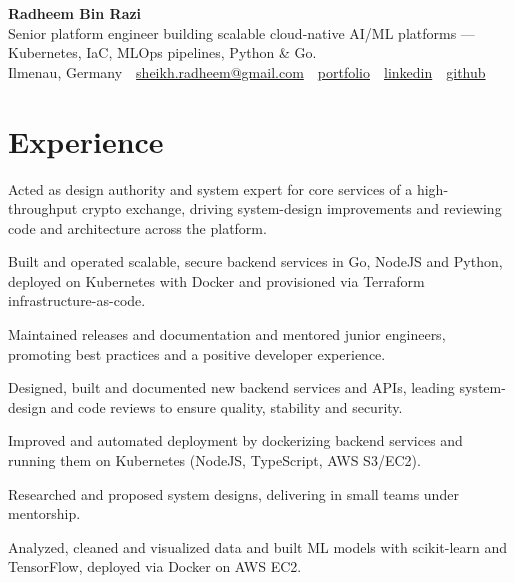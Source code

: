 \documentclass[11pt,a4paper]{resume}
\makeatletter
\newcommand{\Portfolio}{https://radheem.github.io/my-cv}
\newcommand{\PortfolioText}{portfolio}
\newcommand{\GitHub}{https://github.com/radheem}
\newcommand{\LinkedIn}{https://www.linkedin.com/in/radheem-razi}
\newcommand{\Email}{sheikh.radheem@gmail.com}
\makeatother
\begin{document}
\begin{center}
  {\huge\bfseries Radheem Bin Razi}\\[3pt]
  {\large Senior platform engineer building scalable cloud-native AI/ML platforms — Kubernetes, IaC, MLOps pipelines, Python \& Go.}\\[6pt]
  \small
  Ilmenau, Germany \,\textbar\,
  \href{mailto:\Email}{\Email} \,\textbar\,
  \href{\Portfolio}{\PortfolioText} \,\textbar\,
  \href{\LinkedIn}{linkedin} \,\textbar\,
  \href{\GitHub}{github}
\end{center}
\vspace{2pt}

\section{Experience}

\bullets
  \item Acted as design authority and system expert for core services of a high-throughput crypto exchange, driving system-design improvements and reviewing code and architecture across the platform.
  \item Built and operated scalable, secure backend services in Go, NodeJS and Python, deployed on Kubernetes with Docker and provisioned via Terraform infrastructure-as-code.
  \item Maintained releases and documentation and mentored junior engineers, promoting best practices and a positive developer experience.
\bulletsend
\vspace{3pt}
\bullets
  \item Designed, built and documented new backend services and APIs, leading system-design and code reviews to ensure quality, stability and security.
  \item Improved and automated deployment by dockerizing backend services and running them on Kubernetes (NodeJS, TypeScript, AWS S3/EC2).
\bulletsend
\vspace{3pt}
\bullets
  \item Researched and proposed system designs, delivering in small teams under mentorship.
  \item Analyzed, cleaned and visualized data and built ML models with scikit-learn and TensorFlow, deployed via Docker on AWS EC2.
\bulletsend
\vspace{3pt}
\end{document}

